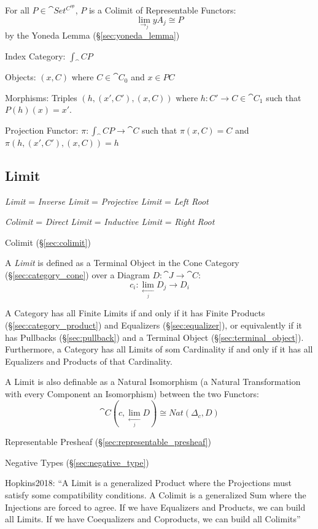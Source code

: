 For all $P \in \cat{Set^{C^{op}}}$, $P$ is a Colimit of
Representable Functors:
\[
  \lim_{\rightarrow_j} yA_j \cong P
\]
by the Yoneda Lemma (\S\ref{sec:yoneda_lemma})

Index Category: $\int_\cat{C} P$

Objects: $(x,C)$ where $C \in \cat{C}_0$ and $x \in PC$

Morphisms: Triples $(h, (x',C'), (x,C))$ where $h : C' \rightarrow C
\in \cat{C}_1$ such that $P(h)(x) = x'$.

Projection Functor: $\pi : \int_\cat{C} P \rightarrow \cat{C}$
such that $\pi(x,C) = C$ and $\pi(h, (x',C'), (x,C)) = h$



\subsection{Limit}\label{sec:limit}

\emph{Limit} = \emph{Inverse Limit} = \emph{Projective Limit} =
\emph{Left Root}

\emph{Colimit} = \emph{Direct Limit} = \emph{Inductive Limit} =
\emph{Right Root}

Colimit (\S\ref{sec:colimit})

A \emph{Limit} is defined as a Terminal Object in the Cone Category
(\S\ref{sec:category_cone}) over a Diagram $D : \cat{J} \rightarrow
\cat{C}$:
\[
  c_i : \lim_{\xleftarrow[j]{}} D_j \rightarrow D_i
\]

A Category has all Finite Limits if and only if it has Finite Products
(\S\ref{sec:category_product}) and Equalizers (\S\ref{sec:equalizer}),
or equivalently if it has Pullbacks (\S\ref{sec:pullback}) and a
Terminal Object (\S\ref{sec:terminal_object}). Furthermore, a Category
has all Limits of som Cardinality if and only if it has all Equalizers
and Products of that Cardinality. \cite{awodey06}

A Limit is also definable as a Natural Isomorphism (a Natural
Transformation with every Component an Isomorphism) between the two
Functors:
\[
  \cat{C}(c, \lim_{\xleftarrow[j]{}} D) \cong Nat (\Delta_c, D)
\]

Representable Presheaf (\S\ref{sec:representable_presheaf})

Negative Types (\S\ref{sec:negative_type})


Hopkins2018: ``A Limit is a generalized Product where the Projections must
satisfy some compatibility conditions. A Colimit is a generalized Sum where the
Injections are forced to agree. If we have Equalizers and Products, we can
build all Limits. If we have Coequalizers and Coproducts, we can build all
Colimits''

